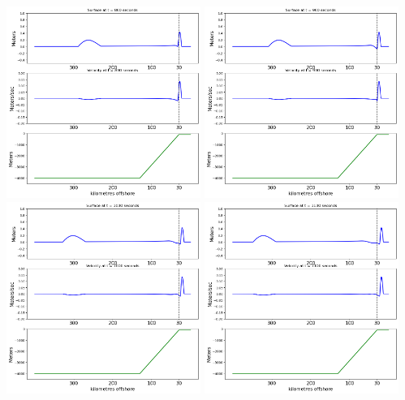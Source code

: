 \documentclass[11pt]{article}
\begin{document}
\vskip 10pt 
\includegraphics[width=0.475\textwidth]{frame0008fig2.png}
\vskip 10pt 
\includegraphics[width=0.475\textwidth]{frame0009fig2.png}
\vskip 10pt 
\includegraphics[width=0.475\textwidth]{frame0010fig2.png}
\vskip 10pt 
\includegraphics[width=0.475\textwidth]{frame0011fig2.png}
\end{document}
